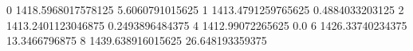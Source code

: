 0 1418.5968017578125 5.6060791015625
1 1413.4791259765625 0.4884033203125
2 1413.2401123046875 0.2493896484375
4 1412.99072265625 0.0
6 1426.33740234375 13.3466796875
8 1439.638916015625 26.648193359375
